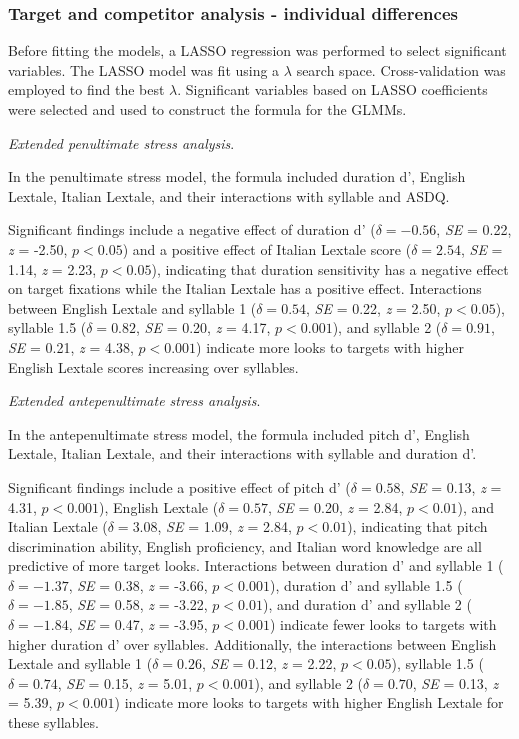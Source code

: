 \subsubsection{Target and competitor analysis - individual differences}

Before fitting the models, a LASSO regression was performed to select significant variables. The LASSO model was fit using a $\lambda$ search space. Cross-validation was employed to find the best $\lambda$. Significant variables based on LASSO coefficients were selected and used to construct the formula for the GLMMs.

\textit{Extended penultimate stress analysis}. 

In the penultimate stress model, the formula included duration d', English Lextale, Italian Lextale, and their interactions with syllable and ASDQ. 

Significant findings include a negative effect of duration d' ($\delta = -0.56$, \textit{SE} = 0.22, \textit{z} = -2.50, $p < 0.05$) and a positive effect of Italian Lextale score ($\delta = 2.54$, \textit{SE} = 1.14, \textit{z} = 2.23, $p < 0.05$), indicating that duration sensitivity has a negative effect on target fixations while the Italian Lextale has a positive effect. Interactions between English Lextale and syllable 1 ($\delta = 0.54$, \textit{SE} = 0.22, \textit{z} = 2.50, $p < 0.05$), syllable 1.5 ($\delta = 0.82$, \textit{SE} = 0.20, \textit{z} = 4.17, $p < 0.001$), and syllable 2 ($\delta = 0.91$, \textit{SE} = 0.21, \textit{z} = 4.38, $p < 0.001$) indicate more looks to targets with higher English Lextale scores increasing over syllables.

\textit{Extended antepenultimate stress analysis}.

In the antepenultimate stress model, the formula included pitch d', English Lextale, Italian Lextale, and their interactions with syllable and duration d'. 

Significant findings include a positive effect of pitch d' ($\delta = 0.58$, \textit{SE} = 0.13, \textit{z} = 4.31, $p < 0.001$), English Lextale ($\delta = 0.57$, \textit{SE} = 0.20, \textit{z} = 2.84, $p < 0.01$), and Italian Lextale ($\delta = 3.08$, \textit{SE} = 1.09, \textit{z} = 2.84, $p < 0.01$), indicating that pitch discrimination ability, English proficiency, and Italian word knowledge are all predictive of more target looks. Interactions between duration d' and syllable 1 ($\delta = -1.37$, \textit{SE} = 0.38, \textit{z} = -3.66, $p < 0.001$), duration d' and syllable 1.5 ($\delta = -1.85$, \textit{SE} = 0.58, \textit{z} = -3.22, $p < 0.01$), and duration d' and syllable 2 ($\delta = -1.84$, \textit{SE} = 0.47, \textit{z} = -3.95, $p < 0.001$) indicate fewer looks to targets with higher duration d' over syllables. Additionally, the interactions between English Lextale and syllable 1 ($\delta = 0.26$, \textit{SE} = 0.12, \textit{z} = 2.22, $p < 0.05$), syllable 1.5 ($\delta = 0.74$, \textit{SE} = 0.15, \textit{z} = 5.01, $p < 0.001$), and syllable 2 ($\delta = 0.70$, \textit{SE} = 0.13, \textit{z} = 5.39, $p < 0.001$) indicate more looks to targets with higher English Lextale for these syllables. 

